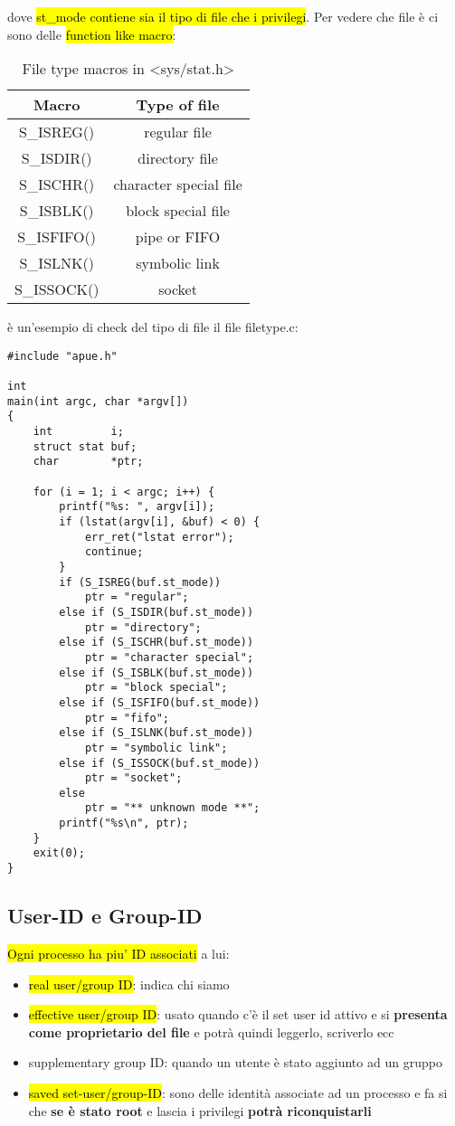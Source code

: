 dove \hl{st\_mode contiene sia il tipo di file che i privilegi}. Per vedere che file è ci sono delle \hl{function like macro}:

\begin{table}[!h]
	\centering
	\begin{tabular}{|c|c|}
		\hline
		\textbf{Macro} & \textbf{Type of file} \\\hline\hline
		S\_ISREG() & regular file \\
		S\_ISDIR() & directory file \\
		S\_ISCHR() & character special file \\
		S\_ISBLK() & block special file \\
		S\_ISFIFO() & pipe or FIFO \\
		S\_ISLNK() & symbolic link \\
		S\_ISSOCK() & socket \\\hline
	\end{tabular}
	\caption{\label{tab:widgets}File type macros in <sys/stat.h>}
\end{table}

è un'esempio di check del tipo di file il file filetype.c:

\begin{lstlisting}
#include "apue.h"

int
main(int argc, char *argv[])
{
	int			i;
	struct stat	buf;
	char		*ptr;

	for (i = 1; i < argc; i++) {
		printf("%s: ", argv[i]);
		if (lstat(argv[i], &buf) < 0) {
			err_ret("lstat error");
			continue;
		}
		if (S_ISREG(buf.st_mode))
			ptr = "regular";
		else if (S_ISDIR(buf.st_mode))
			ptr = "directory";
		else if (S_ISCHR(buf.st_mode))
			ptr = "character special";
		else if (S_ISBLK(buf.st_mode))
			ptr = "block special";
		else if (S_ISFIFO(buf.st_mode))
			ptr = "fifo";
		else if (S_ISLNK(buf.st_mode))
			ptr = "symbolic link";
		else if (S_ISSOCK(buf.st_mode))
			ptr = "socket";
		else
			ptr = "** unknown mode **";
		printf("%s\n", ptr);
	}
	exit(0);
}	
\end{lstlisting}


\subsection{User-ID e Group-ID}

\hl{Ogni processo ha piu' ID associati} a lui:

\begin{itemize}
	\item \hl{real user/group ID}: indica chi siamo
	\item \hl{effective user/group ID}: usato quando c'è il set user id attivo e si \textbf{presenta come proprietario del file} e potrà quindi leggerlo, scriverlo ecc
	\item supplementary group ID: quando un utente è stato aggiunto ad un gruppo
	\item \hl{saved set-user/group-ID}: sono delle identità associate ad un processo e fa si che \textbf{se è stato root} e lascia i privilegi \textbf{potrà riconquistarli}
\end{itemize}

